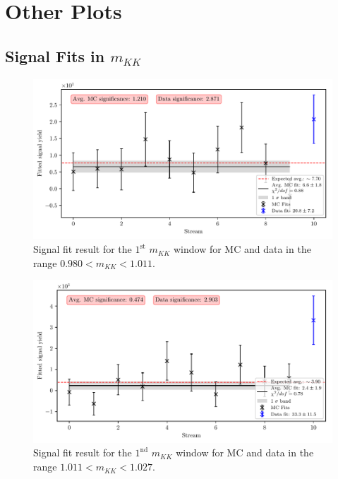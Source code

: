 \chapter{Other Plots}\label{sec:other_plots}

\section{Signal Fits in \texorpdfstring{$m_{KK}$}{mKK}}

\begin{figure}[H]
	\centering
	\captionsetup{width=0.8\linewidth}
	\includegraphics[width=\linewidth]{fig/sig_mKK_1}
	\caption{Signal fit result for the $1^{\mathrm{st}}$ $m_{KK}$ window for MC and data in the range $0.980  < m_{KK} < 1.011$.}
\end{figure} 

\begin{figure}[H]
	\centering
	\captionsetup{width=0.8\linewidth}
	\includegraphics[width=\linewidth]{fig/sig_mKK_2}
	\caption{Signal fit result for the $1^{\mathrm{nd}}$ $m_{KK}$ window for MC and data in the range $1.011  < m_{KK} < 1.027$.}
\end{figure}

